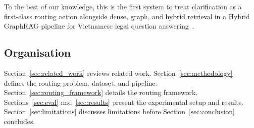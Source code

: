 To the best of our knowledge, this is the first system to treat
clarification as a first-class routing action alongside dense, graph, and
hybrid retrieval in a Hybrid GraphRAG pipeline for Vietnamese legal question
answering~\cite{sovrano2020legalkg,zhong2020nlp_law}.

\subsection{Organisation}\label{subsec:organisation}

Section~\ref{sec:related_work} reviews related work.
Section~\ref{sec:methodology} defines the routing problem, dataset, and
pipeline. Section~\ref{sec:routing_framework} details the routing framework.
Sections~\ref{sec:eval} and~\ref{sec:results} present the experimental setup
and results. Section~\ref{sec:limitations} discusses limitations before
Section~\ref{sec:conclusion} concludes.
